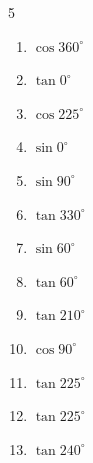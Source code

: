 \begin{multicols}{5}
\begin{enumerate}
  \item $\displaystyle \cos{360^\circ}$

        \phantom{$\displaystyle =1$}

  \item $\displaystyle \tan{0^\circ}$

        \phantom{$\displaystyle =0$}

  \item $\displaystyle \cos{225^\circ}$


  \item $\displaystyle \sin{0^\circ}$

        \phantom{$\displaystyle =0$}

  \item $\displaystyle \sin{90^\circ}$

        \phantom{$\displaystyle =1$}

  \item $\displaystyle \tan{330^\circ}$


  \item $\displaystyle \sin{60^\circ}$


  \item $\displaystyle \tan{60^\circ}$


  \item $\displaystyle \tan{210^\circ}$


  \item $\displaystyle \cos{90^\circ}$

        \phantom{$\displaystyle =0$}

  \item $\displaystyle \tan{225^\circ}$

        \phantom{$\displaystyle =1$}

  \item $\displaystyle \tan{225^\circ}$

        \phantom{$\displaystyle =1$}

  \item $\displaystyle \tan{240^\circ}$



\end{enumerate}
\end{multicols}

